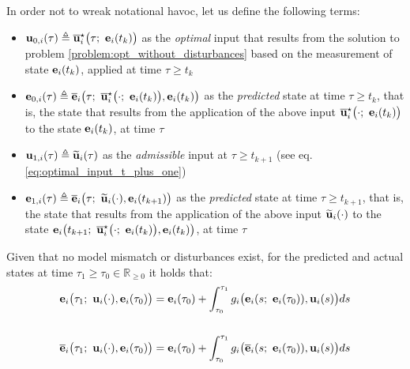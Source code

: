 In order not to wreak notational havoc, let us define the following terms:
\begin{gg_box}
\begin{itemize}
  \item $\bm{\mathbf{u}}_{0,i}(\tau) \triangleq \overline{\bm{\mathbf{u}}}_i^{\star}\big(\tau;\ \bm{\mathbf{e}}_i(t_k)\big)$
    as the \textit{optimal} input that results from the solution to problem
    \eqref{problem:opt_without_disturbances} based on the measurement of state
    $\bm{\mathbf{e}}_i(t_k)$, applied at time $\tau \geq t_k$
  \item $\vect{e}_{0,i}(\tau) \triangleq \overline{\vect{e}}_i\big(\tau;\ \overline{\vect{u}}_i^{\star}\big(\cdot;\ \vect{e}_i(t_k)\big), \vect{e}_i(t_k)\big)$
    as the \textit{predicted} state at time $\tau \geq t_k$, that is,
    the state that results from the application of the above input
    $\overline{\vect{u}}_i^{\star}\big(\cdot;\ \vect{e}_i(t_k)\big)$ to the
    state $\bm{\mathbf{e}}_i(t_k)$, at time $\tau$
  \item $\bm{\mathbf{u}}_{1,i}(\tau) \triangleq \widetilde{\bm{\mathbf{u}}}_i(\tau)$
    as the \textit{admissible} input at $\tau \geq t_{k+1}$ (see eq. \eqref{eq:optimal_input_t_plus_one})
  \item $\bm{\mathbf{e}}_{1,i}(\tau) \triangleq \overline{\bm{\mathbf{e}}}_i\big(\tau;\ \widetilde{\bm{\mathbf{u}}}_i(\cdot), \bm{\mathbf{e}}_i(t_{k+1})\big)$
    as the \textit{predicted} state at time $\tau \geq t_{k+1}$, that is,
    the state that results from the application of the above input
    $\widetilde{\bm{\mathbf{u}}}_i(\cdot)$ to the state
    $\vect{e}_i\big(t_{k+1};\ \overline{\vect{u}}_i^{\star}\big(\cdot;\ \vect{e}_i(t_k)\big), \vect{e}_i(t_k)\big)$, at time $\tau$
\end{itemize}
\end{gg_box}

\begin{bw_box}
  \begin{remark}
  \label{remark:predicted_actual_equations_without_disturbance}
    Given that no model mismatch or disturbances exist, for
    the predicted and actual states at time
    $\tau_1 \geq \tau_0 \in \mathbb{R}_{\geq 0}$ it holds that:
    \begin{align}
      \bm{\mathbf{e}}_i\big(\tau_1;\ \bm{\mathbf{u}}_i(\cdot), \bm{\mathbf{e}}_i(\tau_0)\big) &=
        \bm{\mathbf{e}}_i(\tau_0) + \int_{\tau_0}^{\tau_1} g_i\big(\bm{\mathbf{e}}_i(s;\ \bm{\mathbf{e}}_i(\tau_0)), \bm{\mathbf{u}}_i(s)\big) ds \\\\
      \overline{\bm{\mathbf{e}}}_i\big(\tau_1;\ \bm{\mathbf{u}}_i(\cdot), \bm{\mathbf{e}}_i(\tau_0)\big) &=
        \bm{\mathbf{e}}_i(\tau_0) + \int_{\tau_0}^{\tau_1} g_i\big(\overline{\bm{\mathbf{e}}}_i(s;\ \bm{\mathbf{e}}_i(\tau_0)), \bm{\mathbf{u}}_i(s)\big) ds
    \end{align}
  \end{remark}
\end{bw_box}

